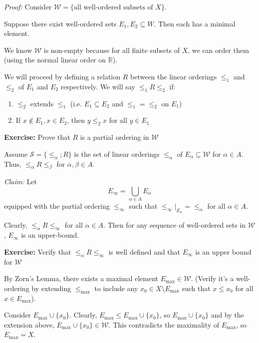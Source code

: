 \documentclass[12pt]{report}
\newcommand{\R}{\mathbb{R}}
\newcommand{\sub}{\subseteq}
\newenvironment*{tbox}[2][gray]{
    \begin{tcolorbox}[
        parbox=false,
        colback=#1!5!white,
        colframe=#1!75!black,
        breakable,
        title={#2}
    ]}
    {\end{tcolorbox}}
\newenvironment*{exercise}[1][red]{
    \begin{tcolorbox}[
        parbox=false,
        colback=#1!5!white,
        colframe=#1!75!black,
        breakable
    ]}
    {\end{tcolorbox}}
\begin{document}
    \begin{tbox}{\textbf{Well-ordering Principle:} Every non-empty set $X$ can be well-ordered}
        \emph{Proof:} Consider $\mathcal{W} = \{\text{all well-ordered subsets of } X\}$.
        
        Suppose there exist well-ordered sets $E_1, E_2 \sub W$. Then each has a minimal element.  

        We know $\mathcal W$ is non-empty because for all finite subsets of $X$, we can order them (using the normal linear order on $\R$). 

        We will proceed by defining a relation $R$ between the linear orderings $\leq_1$ and $\leq_2$ of $E_1$ and $E_2$ respectively. We will say $\leq_1 R \leq_2$ if:
        \begin{enumerate}
            \item $\leq_2$ extends $\leq_1$ (i.e. $E_1 \sub E_2$ and $\leq_1 = \leq_2$ on $E_1$)
            \item If $x \notin E_1, x \in E_2$, then $y \leq_2 x$ for all $y \in E_1$
        \end{enumerate}

        \begin{exercise}
            \textbf{Exercise:} Prove that $R$ is a partial ordering in $\mathcal W$
        \end{exercise}
        
        Assume $\mathcal S = \{\leq_{\alpha} ; R\}$ is the set of linear orderings $\leq_{\alpha}$ of $E_{\alpha} \sub \mathcal W$ for $\alpha \in A$. Thus, $\leq_{\alpha} R \leq_{\beta}$ for $\alpha, \beta \in A$.

        \emph{Claim:} Let
        \[E_{\infty} = \bigcup_{\alpha \in A} E_{\alpha}\]
        equipped with the partial ordering $\leq_{\infty}$ such that $\leq_{\infty}\big\vert_{E_{\alpha}} = \leq_{\alpha}$ for all $\alpha \in A$. 

        Clearly, $\leq_{\alpha} R \leq_{\infty}$ for all $\alpha \in A$. Then for any sequence of well-ordered sets in $\mathcal W$, $E_{\infty}$ is an upper-bound. 
        
        \begin{exercise}
            \textbf{Exercise:} Verify that $\leq_{\alpha} R \leq_{\infty}$ is well defined and that $E_{\infty}$ is an upper bound for $\mathcal W$
        \end{exercise}

        By Zorn's Lemma, there exists a maximal element $E_{\max} \in \mathcal W$. (Verify it's a well-ordering by extending $\leq_{\max}$ to include any $x_0 \in X\setminus E_{\max}$ such that $x \leq x_0$ for all $x \in E_{\max}$).
        
        Consider $E_{\max} \cup \{x_0\}$. Clearly, $E_{\max} \leq E_{\max} \cup \{x_0\}$, so $E_{\max} \cup \{x_0\}$ and by the extension above, $E_{\max} \cup \{x_0\} \in \mathcal W$. This contradicts the maximality of $E_{\max}$, so $E_{\max} = X$.
    \end{tbox}
\end{document}
